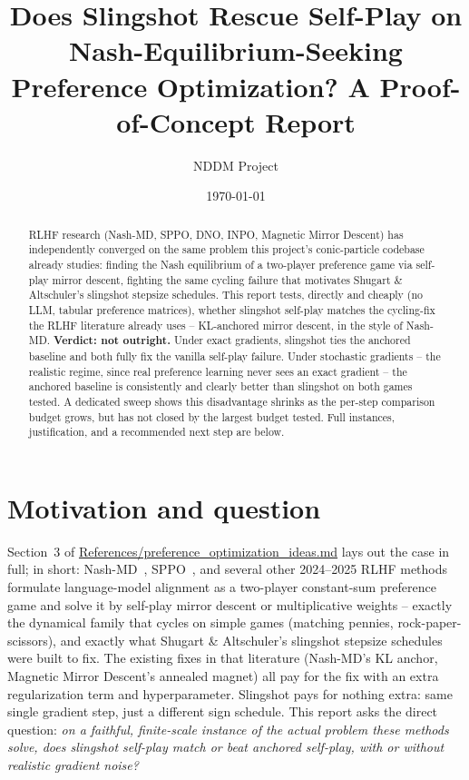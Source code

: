 \documentclass[11pt]{article}
\title{Does Slingshot Rescue Self-Play on Nash-Equilibrium-Seeking\\
Preference Optimization? A Proof-of-Concept Report}
\author{NDDM Project}
\date{\today}
\begin{document}
\maketitle

\begin{abstract}
RLHF research (Nash-MD, SPPO, DNO, INPO, Magnetic Mirror Descent) has
independently converged on the same problem this project's conic-particle
codebase already studies: finding the Nash equilibrium of a two-player
preference game via self-play mirror descent, fighting the same cycling
failure that motivates Shugart \& Altschuler's slingshot stepsize schedules.
This report tests, directly and cheaply (no LLM, tabular preference
matrices), whether slingshot self-play matches the cycling-fix the RLHF
literature already uses -- KL-anchored mirror descent, in the style of
Nash-MD. \textbf{Verdict: not outright.} Under exact gradients, slingshot
ties the anchored baseline and both fully fix the vanilla self-play failure.
Under stochastic gradients -- the realistic regime, since real preference
learning never sees an exact gradient -- the anchored baseline is
consistently and clearly better than slingshot on both games tested. A
dedicated sweep shows this disadvantage shrinks as the per-step comparison
budget grows, but has not closed by the largest budget tested. Full
instances, justification, and a recommended next step are below.
\end{abstract}

\tableofcontents

\section{Motivation and question}
Section~3 of \url{References/preference_optimization_ideas.md} lays out
the case in full; in short: Nash-MD~\cite{nashmd}, SPPO~\cite{sppo}, and
several other 2024--2025 RLHF methods formulate language-model alignment as
a two-player constant-sum preference game and solve it by self-play mirror
descent or multiplicative weights -- exactly the dynamical family that
cycles on simple games (matching pennies, rock-paper-scissors), and exactly
what Shugart \& Altschuler's slingshot stepsize schedules~\cite{slingshot}
were built to fix. The existing fixes in that literature (Nash-MD's KL
anchor, Magnetic Mirror Descent's annealed magnet) all pay for the fix with
an extra regularization term and hyperparameter. Slingshot pays for nothing
extra: same single gradient step, just a different sign schedule. This
report asks the direct question: \emph{on a faithful, finite-scale instance
of the actual problem these methods solve, does slingshot self-play match
or beat anchored self-play, with or without realistic gradient noise?}
\end{document}
